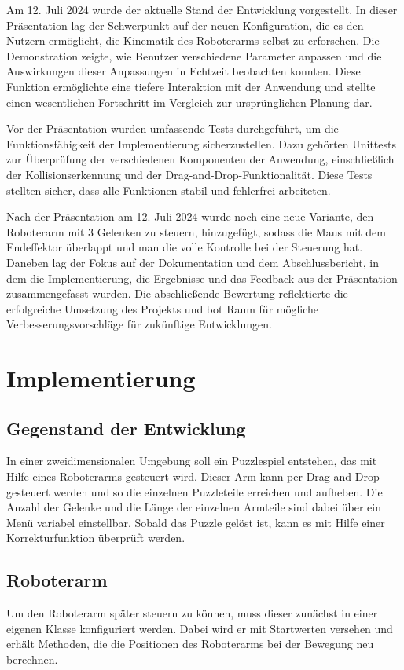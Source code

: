 \documentclass[12pt]{article}
\begin{document}
    Am 12. Juli 2024 wurde der aktuelle Stand der Entwicklung vorgestellt. In dieser Präsentation lag der
    Schwerpunkt auf der neuen Konfiguration, die es den Nutzern ermöglicht, die Kinematik des Roboterarms
    selbst zu erforschen. Die Demonstration zeigte, wie Benutzer verschiedene Parameter anpassen und die
    Auswirkungen dieser Anpassungen in Echtzeit beobachten konnten. Diese Funktion ermöglichte eine tiefere
    Interaktion mit der Anwendung und stellte einen wesentlichen Fortschritt im Vergleich zur ursprünglichen
    Planung dar.

    Vor der Präsentation wurden umfassende Tests durchgeführt, um die Funktionsfähigkeit der Implementierung
    sicherzustellen. Dazu gehörten Unittests zur Überprüfung der verschiedenen Komponenten der Anwendung,
    einschließlich der Kollisionserkennung und der Drag-and-Drop-Funktionalität. Diese Tests stellten sicher,
    dass alle Funktionen stabil und fehlerfrei arbeiteten.

    Nach der Präsentation am 12. Juli 2024 wurde noch eine neue Variante, den Roboterarm mit 3 Gelenken zu
    steuern, hinzugefügt, sodass die Maus mit dem Endeffektor überlappt und man die volle Kontrolle bei der
    Steuerung hat. Daneben lag der Fokus auf der Dokumentation und dem Abschlussbericht, in dem die
    Implementierung, die Ergebnisse und das Feedback aus der Präsentation zusammengefasst wurden. Die
    abschließende Bewertung reflektierte die erfolgreiche Umsetzung des Projekts und bot Raum für mögliche
    Verbesserungsvorschläge für zukünftige Entwicklungen.

    \section{Implementierung}

    \subsection{Gegenstand der Entwicklung}
    In einer zweidimensionalen Umgebung soll ein Puzzlespiel entstehen, das mit Hilfe eines Roboterarms
    gesteuert wird. Dieser Arm kann per Drag-and-Drop gesteuert werden und so die einzelnen Puzzleteile
    erreichen und aufheben. Die Anzahl der Gelenke und die Länge der einzelnen Armteile sind dabei über
    ein Menü variabel einstellbar. Sobald das Puzzle gelöst ist, kann es mit Hilfe einer Korrekturfunktion
    überprüft werden.

    \subsection{Roboterarm}
    Um den Roboterarm später steuern zu können, muss dieser zunächst in einer eigenen Klasse konfiguriert
    werden. Dabei wird er mit Startwerten versehen und erhält Methoden, die die Positionen des Roboterarms
    bei der Bewegung neu berechnen.
\end{document}
